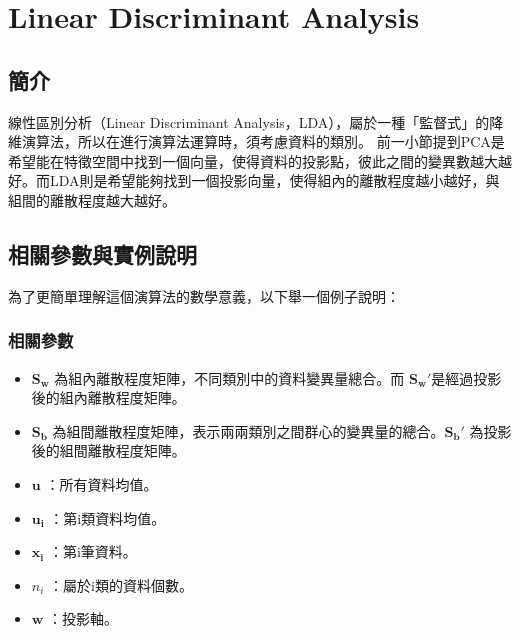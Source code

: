 \chapter{Linear Discriminant Analysis}
\label{chapter:lda}
\section{簡介}
\label{sec:LdaIntroduction}





線性區別分析（Linear Discriminant Analysis，LDA），屬於一種「監督式」的降維演算法，所以在進行演算法運算時，須考慮資料的類別。
前一小節提到PCA是希望能在特徵空間中找到一個向量，使得資料的投影點，彼此之間的變異數越大越好。而LDA則是希望能夠找到一個投影向量，使得組內的離散程度越小越好，與組間的離散程度越大越好。




\section{相關參數與實例說明}
為了更簡單理解這個演算法的數學意義，以下舉一個例子說明：


\subsection{相關參數}

\begin{itemize}
	\item
	      \(\mathbf{S_w}\) 為組內離散程度矩陣，不同類別中的資料變異量總合。而 \(\mathbf{{S_w}'}\)是經過投影後的組內離散程度矩陣。
	\item
	      \(\mathbf{S_b}\) 為組間離散程度矩陣，表示兩兩類別之間群心的變異量的總合。\(\mathbf{{S_b}'}\) 為投影後的組間離散程度矩陣。
	\item
	      \(\mathbf{u}\) ：所有資料均值。
	\item
	      \(\mathbf{u_i}\) ：第i類資料均值。
	\item
	      \(\mathbf{x_i}\) ：第i筆資料。
	\item
	      \(n_i\) ：屬於i類的資料個數。
	\item
	      \(\mathbf{w}\) ：投影軸。
\end{itemize}

